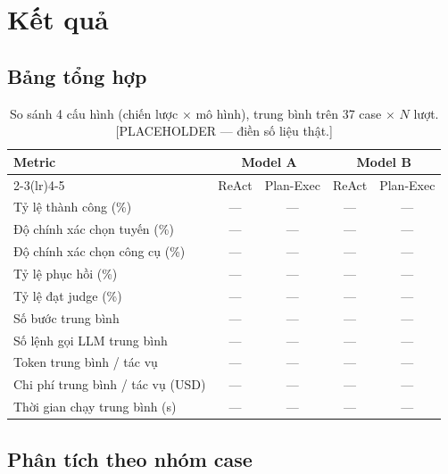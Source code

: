 \section{Kết quả}
\label{sec:ket-qua}


\subsection{Bảng tổng hợp}

\begin{table}[ht]
\centering
\caption{So sánh 4 cấu hình (chiến lược $\times$ mô hình), trung bình trên
37 case $\times$ $N$ lượt. [PLACEHOLDER --- điền số liệu thật.]}
\label{tab:ket-qua-tong-hop}
\begin{tabular}{lcccc}
\toprule
Metric & \multicolumn{2}{c}{Model A} & \multicolumn{2}{c}{Model B} \\
\cmidrule(lr){2-3}\cmidrule(lr){4-5}
 & ReAct & Plan-Exec & ReAct & Plan-Exec \\
\midrule
Tỷ lệ thành công (\%)        & --- & --- & --- & --- \\
Độ chính xác chọn tuyến (\%) & --- & --- & --- & --- \\
Độ chính xác chọn công cụ (\%) & --- & --- & --- & --- \\
Tỷ lệ phục hồi (\%)          & --- & --- & --- & --- \\
Tỷ lệ đạt judge (\%)         & --- & --- & --- & --- \\
Số bước trung bình           & --- & --- & --- & --- \\
Số lệnh gọi LLM trung bình   & --- & --- & --- & --- \\
Token trung bình / tác vụ    & --- & --- & --- & --- \\
Chi phí trung bình / tác vụ (USD) & --- & --- & --- & --- \\
Thời gian chạy trung bình (s) & --- & --- & --- & --- \\
\bottomrule
\end{tabular}
\end{table}

\subsection{Phân tích theo nhóm case}


